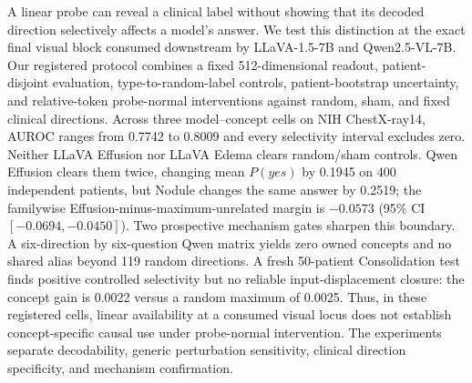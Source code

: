 A linear probe can reveal a clinical label without showing that its decoded direction selectively affects a model's answer. We test this distinction at the exact final visual block consumed downstream by LLaVA-1.5-7B and Qwen2.5-VL-7B. Our registered protocol combines a fixed 512-dimensional readout, patient-disjoint evaluation, type-to-random-label controls, patient-bootstrap uncertainty, and relative-token probe-normal interventions against random, sham, and fixed clinical directions. Across three model--concept cells on NIH ChestX-ray14, AUROC ranges from 0.7742 to 0.8009 and every selectivity interval excludes zero. Neither LLaVA Effusion nor LLaVA Edema clears random/sham controls. Qwen Effusion clears them twice, changing mean $P(yes)$ by 0.1945 on 400 independent patients, but Nodule changes the same answer by 0.2519; the familywise Effusion-minus-maximum-unrelated margin is $-0.0573$ (95\% CI $[-0.0694,-0.0450]$). Two prospective mechanism gates sharpen this boundary. A six-direction by six-question Qwen matrix yields zero owned concepts and no shared alias beyond 119 random directions. A fresh 50-patient Consolidation test finds positive controlled selectivity but no reliable input-displacement closure: the concept gain is 0.0022 versus a random maximum of 0.0025. Thus, in these registered cells, linear availability at a consumed visual locus does not establish concept-specific causal use under probe-normal intervention. The experiments separate decodability, generic perturbation sensitivity, clinical direction specificity, and mechanism confirmation.
